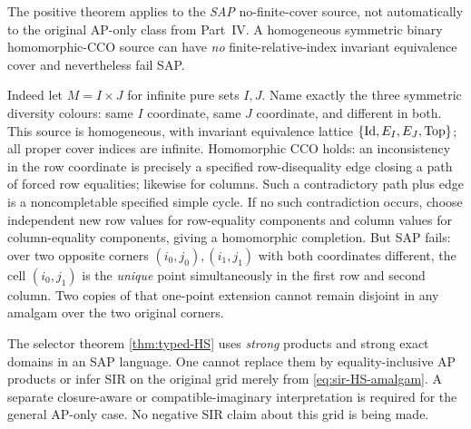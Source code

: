 \begin{remark}
\label{rem:sir-HS-AP-firewall}
The positive theorem applies to
the \emph{SAP} no-finite-cover
source, not automatically to
the original AP-only
class from Part~IV. A homogeneous
symmetric binary homomorphic-CCO
source can have \emph{no}
finite-relative-index invariant
equivalence cover and nevertheless
fail SAP.

Indeed let \(M=I\times J\) for
infinite pure sets \(I,J\).
Name exactly the three symmetric
diversity colours: same \(I\)
coordinate, same \(J\) coordinate,
and different in both.
This source is homogeneous,
with invariant equivalence lattice
\(\{\mathrm{Id},E_I,E_J,\mathrm{Top}\}\);
all proper cover indices are
infinite. Homomorphic CCO holds:
an inconsistency in the row
coordinate is precisely a
specified row-disequality edge
closing a path of forced row
equalities; likewise for columns.
Such a contradictory path
plus edge is a noncompletable
specified simple cycle.
If no such contradiction occurs,
choose independent new row
values for row-equality components
and column values for
column-equality components,
giving a homomorphic completion.
But SAP fails: over two
opposite corners
\((i_0,j_0),(i_1,j_1)\)
with both coordinates different,
the cell \((i_0,j_1)\)
is the \emph{unique} point
simultaneously in the first
row and second column.
Two copies of that one-point
extension cannot remain disjoint
in any amalgam over the
two original corners.

The selector theorem
\cref{thm:typed-HS} uses
\emph{strong} products and
strong exact domains in an
SAP language. One cannot
replace them by equality-inclusive
AP products or infer SIR
on the original grid merely
from \eqref{eq:sir-HS-amalgam}.
A separate closure-aware
or compatible-imaginary
interpretation is required
for the general AP-only
case. No negative SIR claim
about this grid is being made.
\end{remark}
